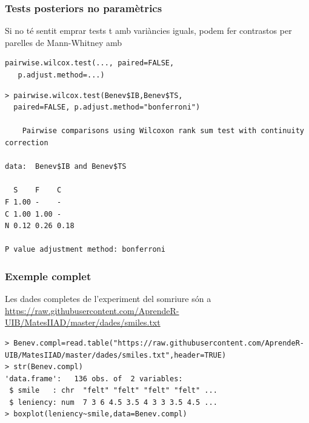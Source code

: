 \documentclass[12pt,t]{beamer}
\newcommand{\blue}[1]{\textcolor{blue}{#1}}
\theoremstyle{plain}
\theoremstyle{definition}
\begin{document}
\begin{frame}[fragile]
\frametitle{Tests posteriors no paramètrics}\vspace*{-1ex}

Si no té sentit emprar tests t amb variàncies iguals, podem fer contrastos per parelles de Mann-Whitney amb
\begin{lstlisting}
pairwise.wilcox.test(..., paired=FALSE,
   p.adjust.method=...)
\end{lstlisting}\pause

\begin{lstlisting}
> pairwise.wilcox.test(Benev$IB,Benev$TS,
  paired=FALSE, p.adjust.method="bonferroni")

	Pairwise comparisons using Wilcoxon rank sum test with continuity correction 

data:  Benev$IB and Benev$TS 

  S    F    C   
F 1.00 -    -   
C 1.00 1.00 -   
N 0.12 0.26 0.18

P value adjustment method: bonferroni
\end{lstlisting}

\end{frame}

\begin{frame}[fragile]
\frametitle{Exemple complet} 

Les dades completes de l'experiment del somriure són a  \blue{\url{https://raw.githubusercontent.com/AprendeR-UIB/MatesIIAD/master/dades/smiles.txt}}\medskip


\begin{lstlisting}
> Benev.compl=read.table("https://raw.githubusercontent.com/AprendeR-UIB/MatesIIAD/master/dades/smiles.txt",header=TRUE)
> str(Benev.compl)
'data.frame':	136 obs. of  2 variables:
 $ smile   : chr  "felt" "felt" "felt" "felt" ...
 $ leniency: num  7 3 6 4.5 3.5 4 3 3 3.5 4.5 ...
> boxplot(leniency~smile,data=Benev.compl)
\end{lstlisting}
\end{frame}
\end{document}
